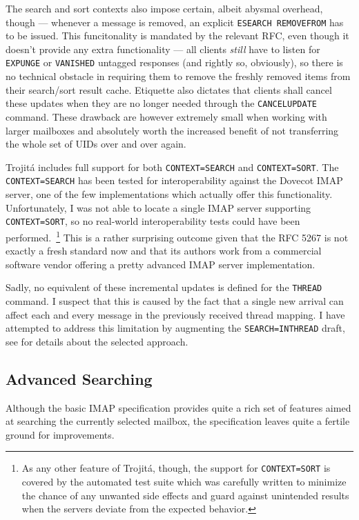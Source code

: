 \documentclass[trojita]{subfiles}
\begin{document}
The search and sort contexts also impose certain, albeit abysmal overhead, though --- whenever a message is removed, an
explicit {\tt ESEARCH REMOVEFROM} has to be issued.  This funcitonality is mandated by the relevant RFC, even though it
doesn't provide any extra functionality --- all clients {\em still} have to listen for {\tt EXPUNGE} or {\tt VANISHED}
untagged responses (and rightly so, obviously), so there is no technical obstacle in requiring them to remove the
freshly removed items from their search/sort result cache.  Etiquette also dictates that clients shall cancel these
updates when they are no longer needed through the {\tt CANCELUPDATE} command.  These drawback are however extremely
small when working with larger mailboxes and absolutely worth the increased benefit of not transferring the whole set of
UIDs over and over again.

Trojitá includes full support for both {\tt CONTEXT=SEARCH} and {\tt CONTEXT=SORT}.  The {\tt CONTEXT=SEARCH} has been
tested for interoperability against the Dovecot IMAP server, one of the few implementations which actually offer this
functionality.  Unfortunately, I was not able to locate a single IMAP server supporting {\tt CONTEXT=SORT}, so no
real-world interoperability tests could have been performed.~\footnote{As any other feature of Trojitá, though, the
support for {\tt CONTEXT=SORT} is covered by the automated test suite which was carefully written to minimize the chance
of any unwanted side effects and guard against unintended results when the servers deviate from the expected behavior.}
This is a rather surprising outcome given that the RFC 5267 is not exactly a fresh standard now and that its authors
work from a commercial software vendor offering a pretty advanced IMAP server implementation.

Sadly, no equivalent of these incremental updates is defined for the {\tt THREAD} command.  I suspect that this is
caused by the fact that a single new arrival can affect each and every message in the previously received thread
mapping.  I have attempted to address this limitation by augmenting the {\tt SEARCH=INTHREAD} draft, see
 for details about the selected approach.

\subsection{Advanced Searching}

Although the basic IMAP specification provides quite a rich set of features aimed at searching the currently selected
mailbox, the specification leaves quite a fertile ground for improvements.
\end{document}
